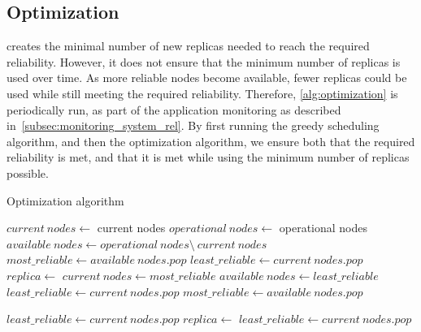 \documentclass{cslthse-msc}
\begin{document}
\subsection{Optimization} \label{subsec:design_optimization}
 creates the minimal number of new replicas needed to reach the required reliability. However, it does not ensure that the minimum number of replicas is used over time. As more reliable nodes become available, fewer replicas could be used while still meeting the required reliability. Therefore, \cref{alg:optimization} is periodically run, as part of the application monitoring as described in~\cref{subsec:monitoring_system_rel}. By first running the greedy scheduling algorithm, and then the optimization algorithm, we ensure both that the required reliability is met, and that it is met while using the minimum number of replicas possible.
 

\begin{algorithm} 
	\caption{Optimization algorithm} \label{alg:optimization}
	\begin{algorithmic}[1]
	\State $current\ nodes\gets $ current nodes
	\State $operational\ nodes\gets $ operational nodes
	\State $available\ nodes\gets operational\ nodes \setminus \ current\ nodes$
	\State
	\State
	\State $most\_reliable\gets available\ nodes.pop$
	\State
	\State $least\_reliable\gets current\ nodes.pop$
	\State
			\State $replica\gets $
			\State
			\State
			\State
			\State $current\ nodes\gets most\_reliable$
			\State $available\ nodes\gets least\_reliable$
			\State $least\_reliable\gets current\ nodes.pop$
			\State $most\_reliable\gets available\ nodes.pop$
	\EndWhile
	\EndProcedure
	\State
	
	\State $least\_reliable\gets current\ nodes.pop$
		\State $replica\gets $
		\State
		\State $least\_reliable\gets current\ nodes.pop$
	\EndWhile
	\EndProcedure
	\end{algorithmic}
\end{algorithm}
\end{document}
